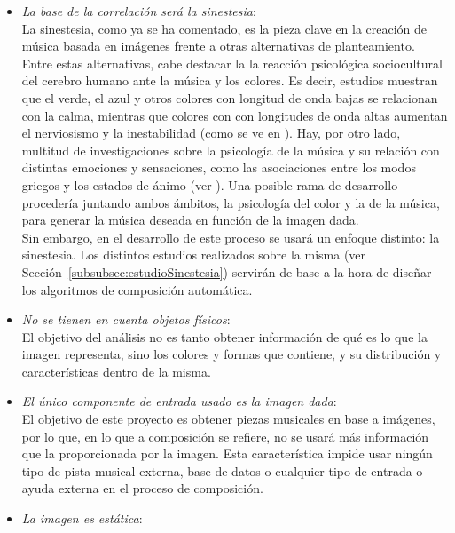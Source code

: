 		\begin{itemize}
		
		\item \emph{La base de la correlación será la sinestesia}:
			\vspace{0.1in}
			\\La sinestesia, como ya se ha comentado, es la pieza clave en la creación de música basada en imágenes frente a otras alternativas de planteamiento.\\
			Entre estas alternativas, cabe destacar la la reacción psicológica sociocultural del cerebro humano ante la música y los colores. Es decir, estudios muestran que el verde, el azul y otros colores con longitud de onda bajas se relacionan con la calma, mientras que colores con con longitudes de onda altas aumentan el nerviosismo y la inestabilidad (como se ve en \cite{colorpsy}). Hay, por otro lado, multitud de investigaciones sobre la psicología de la música y su relación con distintas emociones y sensaciones, como las asociaciones entre los modos griegos y los estados de ánimo (ver \cite{micrologus}). Una posible rama de desarrollo procedería juntando ambos ámbitos, la psicología del color y la de la música, para generar la música deseada en función de la imagen dada.\\
			Sin embargo, en el desarrollo de este proceso se usará un enfoque distinto: la sinestesia. Los distintos estudios realizados sobre la misma (ver Sección~\ref{subsubsec:estudioSinestesia}) servirán de base a la hora de diseñar los algoritmos de composición automática.
		\item \emph{No se tienen en cuenta objetos físicos}:
			\vspace{0.1in}
			\\El objetivo del análisis no es tanto obtener información de qué es lo que la imagen representa, sino los colores y formas que contiene, y su distribución y características dentro de la misma.
		\item \emph{El único componente de entrada usado es la imagen dada}:
			\vspace{0.1in}
			\\El objetivo de este proyecto es obtener piezas musicales en base a imágenes, por lo que, en lo que a composición se refiere, no se usará más información que la proporcionada por la imagen. Esta característica impide usar ningún tipo de pista musical externa, base de datos o cualquier tipo de entrada o ayuda externa en el proceso de composición.
		\item \emph{La imagen es estática}:

\end{itemize}
